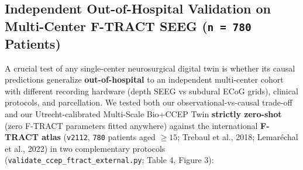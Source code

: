 \documentclass[11pt,a4paper]{article}
\begin{document}
\subsection{Independent Out-of-Hospital Validation on Multi-Center F-TRACT SEEG (\texttt{n = 780} Patients)}
A crucial test of any single-center neurosurgical digital twin is whether its causal predictions generalize \textbf{out-of-hospital} to an independent multi-center cohort with different recording hardware (depth SEEG vs subdural ECoG grids), clinical protocols, and parcellation. We tested both our observational-vs-causal trade-off and our Utrecht-calibrated Multi-Scale Bio+CCEP Twin \textbf{strictly zero-shot} (zero F-TRACT parameters fitted anywhere) against the international \textbf{F-TRACT atlas} (\texttt{v2112}, \texttt{780} patients aged $\ge 15$; Trebaul et al., 2018; Lemaréchal et al., 2022) in two complementary protocols (\texttt{validate\_ccep\_ftract\_external.py}; Table 4, Figure 3):
\end{document}
